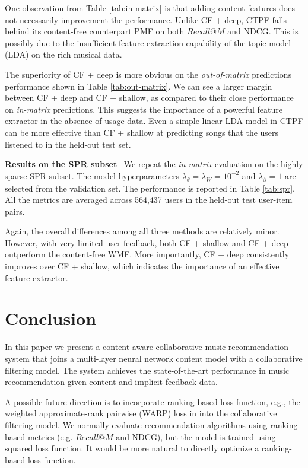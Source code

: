 One observation from Table \ref{tab:in-matrix} is that adding content features does not necessarily improvement the performance. Unlike CF + deep, CTPF falls behind its content-free counterpart PMF on both $Recall@M$ and NDCG. This is possibly due to the insufficient feature extraction capability of the topic model (LDA) on the rich musical data. 

The superiority of CF + deep is more obvious on the \emph{out-of-matrix} predictions performance shown in Table \ref{tab:out-matrix}. We can see a larger margin between CF + deep and CF + shallow, as compared to their close performance on \emph{in-matrix} predictions. This suggests the importance of a powerful feature extractor in the absence of usage data. Even a simple linear LDA model in CTPF can be more effective than CF + shallow at predicting songs that the users listened to in the held-out test set. %

\vspace{0.1in}
\noindent\textbf{Results on the {SPR} subset}~
We repeat the \emph{in-matrix} evaluation on the highly sparse SPR subset. The model hyperparameters $\lambda_\theta = \lambda_W = 10^{-2}$ and $\lambda_\beta = 1$ are selected from the validation set. The performance is reported in Table \ref{tab:spr}. All the metrics are averaged across 564,437 users in the held-out test user-item pairs.

Again, the overall differences among all three methods are relatively minor. However, with very limited user feedback, both CF + shallow and CF + deep outperform the content-free WMF. More importantly, CF + deep consistently improves over CF + shallow, which indicates the importance of an effective feature extractor.  


\section{Conclusion}
In this paper we present a content-aware collaborative music recommendation system that joins a multi-layer neural network content model with a collaborative filtering model. The system achieves the state-of-the-art performance in music recommendation given content and implicit feedback data. 


A possible future direction is to incorporate ranking-based loss function, e.g., the weighted approximate-rank pairwise (WARP) loss in \citet{weston2011wsabie} into the collaborative filtering model. We normally evaluate recommendation algorithms using ranking-based metrics (e.g. $Recall@M$ and NDCG), but the model is trained using squared loss function. It would be more natural to directly optimize a ranking-based loss function.  

